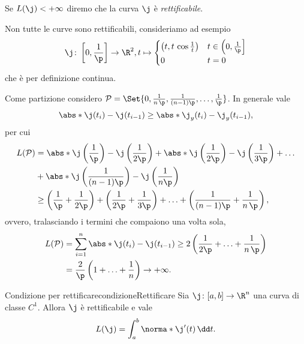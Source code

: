 \begin{notz}
	Se \(L(\j)<+\infty\) diremo che la curva \(\j\) è \emph{rettificabile}.
\end{notz}

\begin{ese}
	Non tutte le curve sono rettificabili, consideriamo ad esempio
	\[
		\j\colon \left[0,\frac{1}{\p}\right] \to \R^2, t \mapsto 	\begin{cases}
			\left(t,t\,\cos \frac{1}{t}\right) & t\in\left(0,\frac{1}{\p}\right] \\
			0                                  & t=0
		\end{cases}
	\]
	che è per definizione continua.

	Come partizione considero \(\mathcal{P}=\Set{0,\frac{1}{n\,\p},\frac{1}{(n-1)\p},\ldots,\frac{1}{\p}}\).
	In generale vale
	\[
		\abs*{\j(t_i)-\j(t_{i-1})} \ge \abs*{\j_y (t_i)-\j_y (t_{i-1})},
	\]
	per cui
	\[
		\begin{split}
			L(\mathcal{P}) & = \abs*{\j \left( \frac{1}{\p} \right) - \j \left( \frac{1}{2\p} \right)} + \abs*{\j \left( \frac{1}{2\p} \right) - \j \left( \frac{1}{3\p} \right)} + \ldots\\
			& +\abs*{\j \left( \frac{1}{(n-1)\p} \right) - \j \left( \frac{1}{n\p} \right)}\\
			& \ge \left( \frac{1}{\p} + \frac{1}{2\p} \right)+\left( \frac{1}{2\p} + \frac{1}{3\p} \right) + \ldots + \left( \frac{1}{(n-1)\p} + \frac{1}{n\,\p} \right),
		\end{split}
	\]
	ovvero, tralasciando i termini che compaiono una volta sola,
	\[
		\begin{split}
			L(\mathcal{P}) & = \sum_{i=1}^n \abs*{\j(t_i)-\j(t_{i-1})} \ge 2 \left( \frac{1}{2\p}+\ldots+\frac{1}{n\,\p}\right)\\
			& = \frac{2}{\p}\left( 1+\ldots+\frac{1}{n} \right) \to +\infty.
		\end{split}
	\]
\end{ese}

\begin{teor}{Condizione per rettificare}{condizioneRettificare}
	Sia \(\j\colon [a,b]\to \R^n\) una curva di classe \(C^1\).
	Allora \(\j\) è rettificabile e vale
	\[
		L(\j) = \int_a^b \norma*{\j'(t)}\,\dd t.
	\]
\end{teor}

